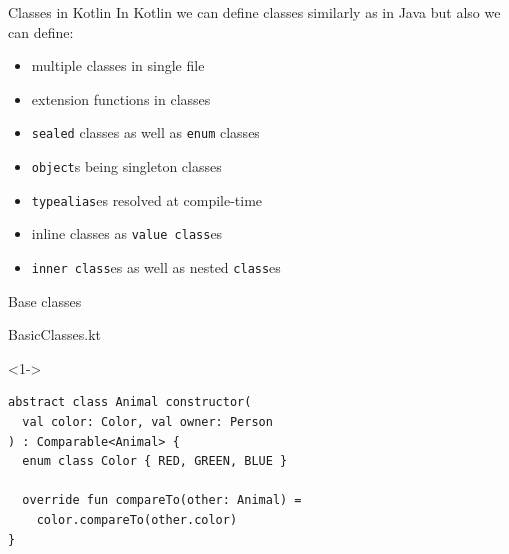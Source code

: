 \documentclass[hyperref={pdfpagelabels=false},xcolor={dvipsnames},compress]{beamer}
\begin{document}
    \begin{frame}{Classes in Kotlin}
        In Kotlin we can define classes similarly as in Java but also we can define:
        \begin{itemize}
            \pause
            \item multiple classes in single file \pause
            \item extension functions in classes \pause
            \item \texttt{sealed} classes as well as \texttt{enum} classes \pause
            \item \texttt{object}s being singleton classes \pause
            \item \texttt{typealias}es resolved at compile-time \pause
            \item inline classes as \texttt{value class}es \pause
            \item \texttt{inner class}es as well as nested \texttt{class}es
        \end{itemize}
    \end{frame}

    \begin{frame}[fragile]{Base classes}
        \begin{exampleblock}{BasicClasses.kt}
            \begin{onlyenv}<1->
                \begin{lstlisting}
abstract class Animal constructor(
  val color: Color, val owner: Person
) : Comparable<Animal> {
  enum class Color { RED, GREEN, BLUE }

  override fun compareTo(other: Animal) =
    color.compareTo(other.color)
}
                \end{lstlisting}
            \end{onlyenv}
        \end{exampleblock}
    \end{frame}
\end{document}
